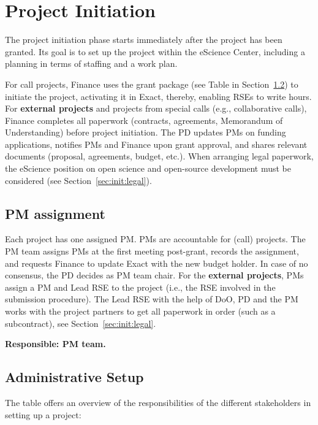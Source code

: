 \section{Project Initiation}
\label{sec:init}
The project initiation phase starts immediately after the project has been granted. Its goal is to set up the project
within the eScience Center, including a planning in terms of staffing and a work plan.

For call projects, Finance uses the grant package (see Table in Section~\ref{sec:init:admin}) to initiate the project, activating it in Exact, thereby, 
enabling RSEs to write hours. For \textbf{external projects} and projects from special calls (e.g., collaborative calls), Finance completes all 
paperwork (contracts, agreements, Memorandum of Understanding) before project initiation. The PD updates PMs on funding applications, notifies PMs 
and Finance upon grant approval, and shares relevant documents (proposal, agreements, budget, etc.). 
When arranging legal paperwork, the eScience position on open science and open-source development must be considered (see Section~\ref{sec:init:legal}).


\subsection{PM assignment}
\label{sec:init:pm-assign}

Each project has one assigned PM. PMs are accountable for (call) projects. The PM team assigns PMs at the first meeting post-grant, records the assignment, 
and requests Finance to update Exact with the new budget holder. In case of no consensus, the PD decides as PM team chair.
% 
For the \textbf{external projects}, PMs assign a PM and Lead RSE to the project
(i.e., the RSE involved in the submission procedure). The Lead RSE with the help of DoO, PD and the PM works with the project partners
to get all paperwork in order (such as a subcontract), see Section~\ref{sec:init:legal}. 

\textbf{Responsible: PM team.}

\subsection{Administrative Setup}
\label{sec:init:admin}
The table offers an overview of the responsibilities of the different stakeholders in setting up a project:

